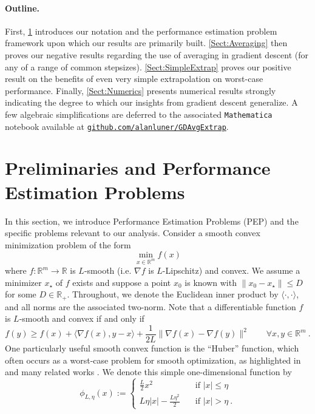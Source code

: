 \documentclass[11pt]{article}
\numberwithin{equation}{section}
\theoremstyle{definition}
\theoremstyle{definition}
\theoremstyle{definition}
\newcommand{\1}{\mathbf{1}}
\newcommand{\xStar}{x_\star}
\newcommand{\dimension}{m}
\begin{document}
\paragraph{Outline.} First, \cref{Sect:Prelim} introduces our notation and the performance estimation problem framework upon which our results are primarily built. \cref{Sect:Averaging} then proves our negative results regarding the use of averaging in gradient descent (for any of a range of common stepsizes). \cref{Sect:SimpleExtrap} proves our positive result on the benefits of even very simple extrapolation on worst-case performance. Finally, \cref{Sect:Numerics} presents numerical results strongly indicating the degree to which our insights from gradient descent generalize. A few algebraic simplifications are deferred to the associated \texttt{Mathematica}~\cite{Mathematica} notebook available at \href{https://github.com/alanluner/GDAvgExtrap}{\texttt{github.com/alanluner/GDAvgExtrap}}.
\section{Preliminaries and Performance Estimation Problems} \label{Sect:Prelim}
In this section, we introduce Performance Estimation Problems (PEP) and the specific problems relevant to our analysis. Consider a smooth convex minimization problem of the form
\begin{equation}
    \min_{x \in \mathbb{R}^\dimension} f(x)
\end{equation}
where $f:\mathbb{R}^\dimension \rightarrow \mathbb{R}$ is $L$-smooth (i.e. $\nabla f$ is $L$-Lipschitz) and convex. We assume a minimizer $\xStar$ of $f$ exists and suppose a point $x_0$ is known with $\|x_0 - \xStar\| \leq D$ for some $D \in \mathbb{R}_+$. 
Throughout, we denote the Euclidean inner product by $\langle\cdot,\cdot\rangle$, and all norms are the associated two-norm. Note that a differentiable function $f$ is $L$-smooth and convex if and only if
\begin{equation}\label{eq:smoothness-charcterization}
    f(y) \geq f(x) + \langle \nabla f(x), y-x\rangle + \frac{1}{2L}\|\nabla f(x) - \nabla f(y)\|^2 \qquad \forall x,y\in\mathbb{R}^\dimension \ .
\end{equation}
One particularly useful smooth convex function is the ``Huber'' function, which often occurs as a worst-case problem for smooth optimization, as highlighted in \cite{Interpolation} and many related works \cite{FirstPEP,OGM,Interpolation2,Teboulle_4T_Analytical}. We denote this simple one-dimensional function by
\begin{equation}\label{Eqn:Huber}
    \phi_{L,\eta}(x) := \begin{cases}
        \frac{L}{2}x^2 \quad &\text{if }|x| \leq \eta \\
        L\eta|x|-\frac{L\eta^2}{2} \quad &\text{if } |x| > \eta  \ .
    \end{cases}
\end{equation}
\end{document}
